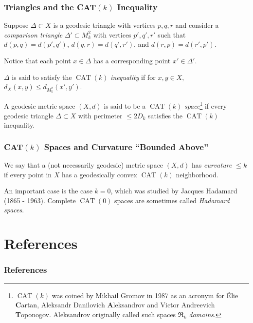 \documentclass[handout]{beamer}
\DeclareMathOperator{\CAT}{CAT}
\theoremstyle{definition}
\begin{document}
\begin{frame}
    \frametitle{Triangles and the CAT$(k)$ Inequality}

    \pause
    Suppose $\Delta \subset X$ is a geodesic triangle with vertices $p,q,r$ and consider a
    \emph{comparison triangle} $\Delta' \subset M_k^2$ with vertices $p',q',r'$ such that
    $d(p,q) = d(p',q')$, $d(q,r) = d(q',r')$, and $d(r,p) = d(r',p')$.

    Notice that each point $x \in \Delta$ has a corresponding point $x' \in \Delta'$.

    \pause
    $\Delta$ is said to satisfy the $\CAT(k)$
    \emph{inequality} if for $x, y \in X$, $d_X(x,y) \leq d_{M^2_k}(x',y')$.

    \pause
    \begin{definition}
        A geodesic metric space $(X,d)$ is said to be a $\CAT(k)$ \emph{space}\footnote{$\CAT(k)$
        was coined by Mikhail Gromov in 1987 as an acronym for Élie \textbf{C}artan,
        Aleksandr Danilovich \textbf{A}leksandrov and Victor Andreevich \textbf{T}oponogov.
        Aleksandrov originally called such spaces \emph{$\mathfrak{R}_k$ domains}.}
        if every geodesic triangle $\Delta \subset X$ with perimeter $\leq 2D_k$
        satisfies the $\CAT(k)$ inequality.
    \end{definition}

\end{frame}

\begin{frame}
    \frametitle{CAT$(k)$ Spaces and Curvature ``Bounded Above''}

    \pause
    \begin{definition}
        We say that a (not necessarily geodesic) metric space $(X,d)$ has \emph{curvature $\leq k$}
        if every point in $X$ has a geodesically convex $\CAT(k)$ neighborhood.
    \end{definition}

    \pause
    An important case is the case $k = 0$, which was studied by Jacques Hadamard (1865 - 1963).
    Complete $\CAT(0)$ spaces are sometimes called \emph{Hadamard spaces}.

\end{frame}

\section{References}

\begin{frame}
    \frametitle{References}

    \printbibliography

\end{frame}
\end{document}
